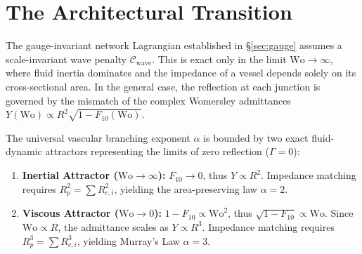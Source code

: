 
\section{The Architectural Transition}
\label{sec:womersley_minimax}

The gauge-invariant network Lagrangian established in \S\ref{sec:gauge} assumes
a scale-invariant wave penalty $\mathcal{C}_{\mathrm{wave}}$. This is exact only
in the limit $\mathrm{Wo}\to\infty$, where fluid inertia dominates and the
impedance of a vessel depends solely on its cross-sectional area. In the general
case, the reflection at each junction is governed by the mismatch of the complex
Womersley admittances $Y(\mathrm{Wo}) \propto R^2 \sqrt{1-F_{10}(\mathrm{Wo})}$.

\begin{theorem}
The universal vascular branching exponent $\alpha$ is bounded by two exact
fluid-dynamic attractors representing the limits of zero reflection ($\Gamma =
0$):
\begin{enumerate}
    \item
\textbf{Inertial Attractor ($\mathrm{Wo} \to \infty$):} $F_{10} \to 0$, thus $Y
\propto R^2$. Impedance matching requires $R_p^2 = \sum R_{c,i}^2$, yielding the
area-preserving law $\alpha = 2$.
    \item
\textbf{Viscous Attractor ($\mathrm{Wo} \to 0$):} $1-F_{10} \propto
\mathrm{Wo}^2$, thus $\sqrt{1-F_{10}} \propto \mathrm{Wo}$. Since $\mathrm{Wo}
\propto R$, the admittance scales as $Y \propto R^3$. Impedance matching
requires $R_p^3 = \sum R_{c,i}^3$, yielding Murray's Law $\alpha = 3$.
\end{enumerate}
\end{theorem}

